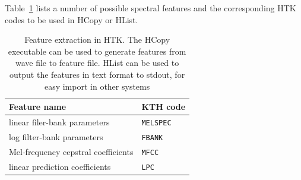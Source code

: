 \documentclass{nada-ten}
\begin{document}
Table~\ref{tab:htk} lists a number of possible spectral features and the corresponding HTK codes to be used in HCopy or HList.
\begin{table}
  \centering
  \begin{tabular}{ll}
    \hline
    Feature name & KTH code \\
    \hline
    linear filer-bank parameters        & \texttt{MELSPEC} \\
    log filter-bank parameters          & \texttt{FBANK}   \\
    Mel-frequency cepstral coefficients & \texttt{MFCC}    \\
    linear prediction coefficients      & \texttt{LPC}     \\
    \hline
  \end{tabular}
  \caption{Feature extraction in HTK. The HCopy executable can be used to generate features from wave file to feature file. HList can be used to output the features in text format to stdout, for easy import in other systems}
  \label{tab:htk}
\end{table}
\end{document}
